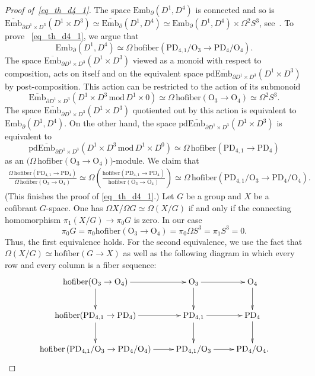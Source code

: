 \documentclass[11pt]{amsart}
\theoremstyle{definition}
\newcommand{\Z}{{\mathbb Z}}
\newcommand{\Ebar}{\overline{\mathrm{Emb}}}
\newcommand{\Emb}{\mathrm{Emb}}
\newcommand{\PL}{\mathrm{PL}}
\newcommand{\OO}{\mathrm{O}}
\newcommand{\PD}{\mathrm{PD}}
\newcommand{\mmod}{\,\mathrm{mod}\,}
\newcommand{\hofiber}{\mathrm{hofiber}}
\numberwithin{equation}{section}
\begin{document}
\begin{proof}[Proof of~\eqref{eq_th_d4_1}]
The space $\Emb_\partial(D^1,D^4)$ is connected and so is $\Ebar_{\partial D^1\times D^3}(D^1\times D^3)\simeq\Ebar_\partial(D^1,D^4)\simeq \Emb_\partial(D^1,D^4)
\times\Omega^2 S^3$,
see~\cite[Proposition~5.17]{Sinha}. 
To prove ~\eqref{eq_th_d4_1}, %
we argue that
\[
\Emb_\partial(D^1,D^4)\simeq\Omega\,\hofiber\left(\PD_{4,1}/\OO_3\to \PD_4/\OO_4\right).
\]
The space $\Ebar_{\partial D^1\times D^3}(D^1\times D^3)$ viewed as a monoid with respect to composition,
acts on itself and on the equivalent space $\mathrm{pd}\Ebar_{\partial D^1\times D^3}(D^1\times D^3)$ by post-composition. This
action can be restricted to the action of its submonoid 
\[
\Ebar_{\partial D^1\times D^3}(D^1\times D^3\mmod D^1\times 0)\simeq \Omega\,\hofiber(\OO_3\to\OO_4)
\simeq\Omega^2 S^3.
\]
The space $\Ebar_{\partial D^1\times D^3}(D^1\times D^3)$ quotiented out by this action is equivalent to
$\Emb_\partial(D^1,D^4)$. %
 On the other hand, the space $\mathrm{pd}\Ebar_{\partial D^1\times D^3}(D^1\times D^3)$
is equivalent to 
\[
\mathrm{pd}\Ebar_{\partial D^1\times D^3}(D^1\times D^3\mmod D^1\times D^0)
\simeq \Omega\,\hofiber(\PD_{4,1}\to\PD_4)
\]
 as an $\bigl( \Omega\,\hofiber(\OO_3\to\OO_4)\bigr)$-module. We claim that
\begin{multline*}
\frac{ \Omega\,\hofiber(\PD_{4,1}\to\PD_4)}{\Omega\,\hofiber(\OO_3\to\OO_4)}
\simeq
\Omega\left(\frac{\hofiber(\PD_{4,1}\to\PD_4)}{\hofiber(\OO_3\to\OO_4)}\right)
\simeq \Omega\,\hofiber\left(\PD_{4,1}/\OO_3\to\PD_4/\OO_4\right).
\end{multline*}
(This finishes the proof of \eqref{eq_th_d4_1}.)
Let $G$ be a group and $X$ be a cofibrant $G$-space. One has $\Omega X/\Omega G\simeq\Omega(X/G)$
if and only if the connecting homomorphism $\pi_1(X/G)\to\pi_0 G$ is zero. In our case 
\[
\pi_0G=\pi_0\hofiber(\OO_3\to\OO_4)=\pi_0\Omega S^3=\pi_1 S^3=0.
\]
Thus, the first equivalence holds. For the second equivalence, we use the fact that $\Omega(X/G)\simeq\hofiber(G\to X)$ as well as the following diagram in which
every row and every column is a fiber sequence:
$$
\xymatrix{
\hofiber(\OO_3\to \OO_4)\ar[d]\ar[r]&\OO_3\ar[r]\ar[d]&\OO_4\ar[d]\\
\hofiber(\PD_{4,1}\to\PD_4)\ar[r]\ar[d]& \PD_{4,1}\ar[r]\ar[d]&\PD_4\ar[d]\\
\hofiber\left(\PD_{4,1}/\OO_3\to\PD_{4}/\OO_4\right)\ar[r]&\PD_{4,1}/\OO_3\ar[r]&\PD_4/\OO_4.
}
$$
\end{proof}
\end{document}
